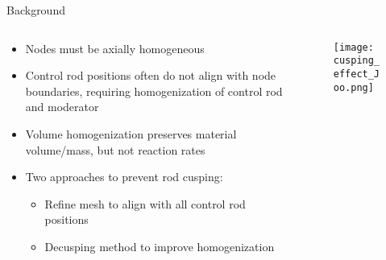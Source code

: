\begin{frame}[t]{Background}

\begin{columns}
\begin{column}{0.6\textwidth}
    \begin{itemize}
        \item Nodes must be axially homogeneous
        \item Control rod positions often do not align with node boundaries, 
        requiring homogenization of control rod and moderator
        \item Volume homogenization preserves material volume/mass, but not 
        reaction rates
        \item Two approaches to prevent rod cusping:
        \begin{itemize}
          \item Refine mesh to align with all control rod positions
          \item Decusping method to improve homogenization
        \end{itemize}
    \end{itemize}
\end{column}
\begin{column}{0.4\textwidth}
\begin{figure}[h]
  \centering
  \texttt{[image: cusping\_effect\_Joo.png]}
\end{figure} 
\end{column}
\end{columns}
    
\end{frame}


